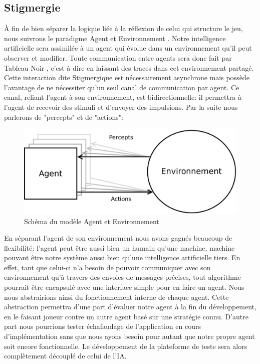 \subsection{ \og Stigmergie \fg{} }

À fin de bien séparer la logique liée à la réflexion de celui qui structure le jeu, nous suivrons le paradigme \og Agent et Environnement \fg{}. Notre intelligence artificielle sera assimilée à un agent qui évolue dans un environnement qu'il peut observer et modifier. 
Toute communication entre agents sera donc fait par \og Tableau Noir \fg{}, c'est à dire en laissant des traces dans cet environnement partagé. Cette interaction dite \og Stigmergique \fg{} est nécessairement asynchrone mais possède l'avantage de ne nécessiter qu'un seul canal de communication par agent.
Ce canal, reliant l'agent à son environnement, est bidirectionnelle: il permettra à l'agent de recevoir des stimuli et d'envoyer des impulsions. Par la suite nous parlerons de "percepts" et de "actions":

\begin{figure}[H] 
\centering
\includegraphics[width=\textwidth]{files/env/agent_env} 
\caption{Schéma du modèle \og Agent et Environnement \fg{}} 
\label{agent_env}
\end{figure}

En séparant l'agent de son environnement nous avons gagnés beaucoup de flexibilité: l'agent peut être aussi bien un humain qu'une machine, machine pouvant être notre système aussi bien qu'une intelligence artificielle tiers. 
En effet, tant que celui-ci n'a besoin de pouvoir communiquer avec son environnement qu'à travers des envoies de messages précises, tout algorithme pourrait être encapsulé avec une interface simple pour en faire un agent. Nous nous abstrairions ainsi du fonctionnement interne de chaque agent.
Cette abstraction permettra d'une part d'évaluer notre agent à la fin du développement, en le faisant joueur contre un autre agent basé sur une stratégie connu. D'autre part nous pourrions tester échafaudage de l'application en cours d'implémentation sans que nous ayons besoin pour autant que notre propre agent soit encore fonctionnelle. Le développement de la plateforme de teste sera alors complètement découplé de celui de l'IA.

